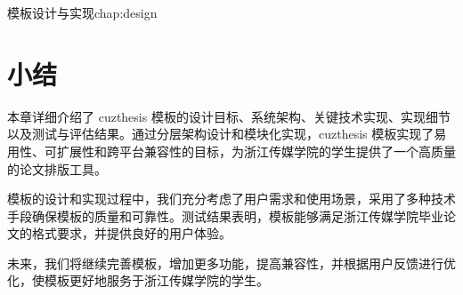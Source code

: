 \begin{cuzchapter}{模板设计与实现}{chap:design}
    \section{小结}\label{sec:design-summary}

    本章详细介绍了 cuzthesis 模板的设计目标、系统架构、关键技术实现、实现细节以及测试与评估结果。通过分层架构设计和模块化实现，cuzthesis 模板实现了易用性、可扩展性和跨平台兼容性的目标，为浙江传媒学院的学生提供了一个高质量的论文排版工具。

    模板的设计和实现过程中，我们充分考虑了用户需求和使用场景，采用了多种技术手段确保模板的质量和可靠性。测试结果表明，模板能够满足浙江传媒学院毕业论文的格式要求，并提供良好的用户体验。

    未来，我们将继续完善模板，增加更多功能，提高兼容性，并根据用户反馈进行优化，使模板更好地服务于浙江传媒学院的学生。

\end{cuzchapter}
